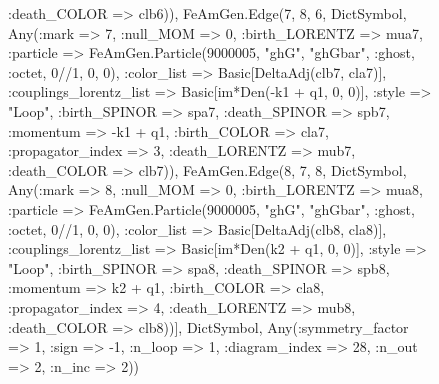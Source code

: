 \documentclass{revtex4}
\begin{document}
\begin{figure}[!htb]
\begin{center}
{:death_COLOR => clb6)), FeAmGen.Edge(7, 8, 6, Dict{Symbol, Any}(:mark => 7, :null_MOM => 0, :birth_LORENTZ => mua7, :particle => FeAmGen.Particle(9000005, "ghG", "ghGbar", :ghost, :octet, 0//1, 0, 0), :color_list => Basic[DeltaAdj(clb7, cla7)], :couplings_lorentz_list => Basic[im*Den(-k1 + q1, 0, 0)], :style => "Loop", :birth_SPINOR => spa7, :death_SPINOR => spb7, :momentum => -k1 + q1, :birth_COLOR => cla7, :propagator_index => 3, :death_LORENTZ => mub7, :death_COLOR => clb7)), FeAmGen.Edge(8, 7, 8, Dict{Symbol, Any}(:mark => 8, :null_MOM => 0, :birth_LORENTZ => mua8, :particle => FeAmGen.Particle(9000005, "ghG", "ghGbar", :ghost, :octet, 0//1, 0, 0), :color_list => Basic[DeltaAdj(clb8, cla8)], :couplings_lorentz_list => Basic[im*Den(k2 + q1, 0, 0)], :style => "Loop", :birth_SPINOR => spa8, :death_SPINOR => spb8, :momentum => k2 + q1, :birth_COLOR => cla8, :propagator_index => 4, :death_LORENTZ => mub8, :death_COLOR => clb8))], Dict{Symbol, Any}(:symmetry_factor => 1, :sign => -1, :n_loop => 1, :diagram_index => 28, :n_out => 2, :n_inc => 2)) 
}
\end{center}
\end{figure}
\end{document}
